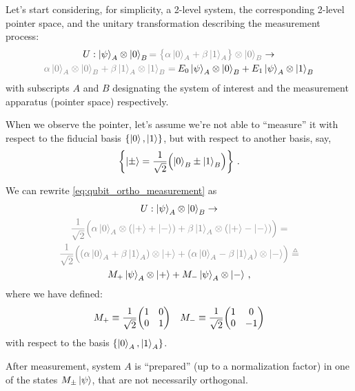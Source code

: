 Let's start considering, for simplicity, a 2-level system,
the corresponding 2-level pointer space,
and the unitary transformation describing the measurement process:
\begin{multline}\label{eq:qubit_ortho_measurement}
  U:
    \ket{\psi}_A \ox \ket{0}_B
    {\color{gray}= \qty\big{\alpha\ket{0}_A + \beta\ket{1}_A} \ox \ket{0}_B}
  \rightarrow \\
    {\color{gray}\alpha\ket{0}_A \ox \ket{0}_B + \beta\ket{1}_A  \ox \ket{1}_B =}
    \:
    E_0\ket{\psi}_A \ox \ket{0}_B + E_1\ket{\psi}_A \ox \ket{1}_B
\end{multline}
with subscripts $A$ and $B$ designating the system of interest and
the measurement apparatus (pointer space) respectively.

When we observe the pointer, let's assume we're not
able to ``measure'' it with respect to the fiducial basis
$\left\{\ket{0}, \ket{1}\right\}$,
but with respect to another basis, say,
\begin{equation}\label{eq:pmbasis}
\left\{\ket{\pm} = \frac{1}{\sqrt{2}} \qty\Big(\ket{0}_B \pm \ket{1}_B)\right\} \,\text{.}
\end{equation}

We can rewrite \eqref{eq:qubit_ortho_measurement} as
\begin{multline}\label{eq:qubit_gen_measurement}
  U: \ket{\psi}_A \ox \ket{0}_B                   \rightarrow \\
  \color{gray}
  \frac{1}{\sqrt{2}} \qty\Big(
    \alpha\ket{0}_A \ox \qty(\ket{+}+\ket{-}) +
    \beta \ket{1}_A \ox \qty(\ket{+}-\ket{-})
  )                                               =           \\
  \color{gray}
  \frac{1}{\sqrt{2}} \qty\Big(
    \qty(\alpha\ket{0}_A + \beta\ket{1}_A) \ox \ket{+} +
    \qty(\alpha\ket{0}_A - \beta\ket{1}_A) \ox \ket{-}
  )                                               \eqdef      \\
  M_+\ket{\psi}_A \ox \ket{+} + M_-\ket{\psi}_A \ox \ket{-}
  \,\text{,}
\end{multline}
where we have defined:
\begin{align*}
  &
  M_+ \repr \frac{1}{\sqrt{2}}\mqty(\imat{2})
  &
  M_- \repr \frac{1}{\sqrt{2}}\mqty(\dmat[0]{1, -1})
\end{align*}
with respect to the basis $\left\{\ket{0}_A, \ket{1}_A\right\}$.

After measurement, system $A$ is ``prepared''
(up to a normalization factor)
in one of the states $M_{\pm}\ket{\psi}$,
that are not necessarily orthogonal.

